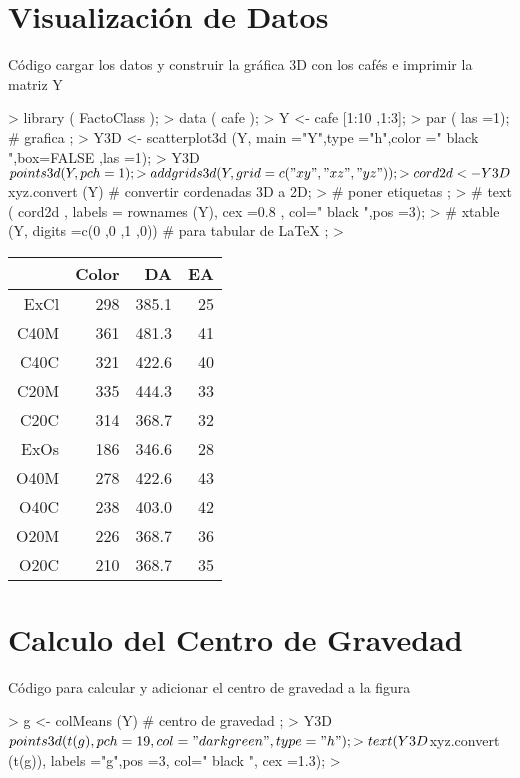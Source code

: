 \documentclass{article}
\begin{document}


\section{Visualización de Datos}
Código cargar los datos y construir la gráfica 3D con los cafés e imprimir la
matriz Y 

\begin{Schunk}
\begin{Sinput}
> library ( FactoClass ); 
> data ( cafe ); 
> Y <- cafe [1:10 ,1:3];
> par ( las =1); # grafica ;
> Y3D <- scatterplot3d (Y, main ="Y",type ="h",color =" black ",box=FALSE ,las =1);
> Y3D $ points3d (Y, pch =1);
> addgrids3d (Y, grid = c("xy","xz","yz"));
> cord2d <-Y3D$xyz.convert (Y) # convertir cordenadas 3D a 2D;
> # poner etiquetas ;
> # text ( cord2d , labels = rownames (Y), cex =0.8 , col=" black ",pos =3);
> # xtable (Y, digits =c(0 ,0 ,1 ,0)) # para tabular de LaTeX ;
> 
\end{Sinput}
\end{Schunk}

\begin{table}[ht]
\centering
\begin{tabular}{rrrr}
\hline
& Color & DA & EA \\
\hline
ExCl & 298 & 385.1 & 25 \\
C40M & 361 & 481.3 & 41 \\
C40C & 321 & 422.6 & 40 \\
C20M & 335 & 444.3 & 33 \\
C20C & 314 & 368.7 & 32 \\
ExOs & 186 & 346.6 & 28 \\
O40M & 278 & 422.6 & 43 \\
O40C & 238 & 403.0 & 42 \\
O20M & 226 & 368.7 & 36 \\
O20C & 210 & 368.7 & 35 \\
\hline
\end{tabular}
\end{table}

\section{Calculo del Centro de Gravedad}
Código para calcular y adicionar el centro de gravedad a la figura

\begin{Schunk}
\begin{Sinput}
> g <- colMeans (Y) # centro de gravedad ;
> Y3D$points3d (t(g), pch =19 , col=" darkgreen ",type = "h");
> text ( Y3D$xyz.convert (t(g)), labels ="g",pos =3, col=" black ", cex =1.3);
> 
\end{Sinput}
\end{Schunk}
\end{document}
